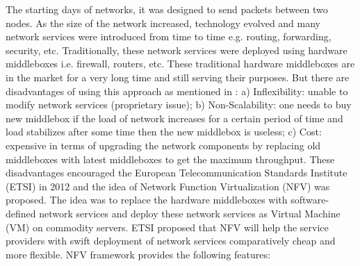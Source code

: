 \documentclass[10pt, a4paper, conference]{IEEEtran}
\begin{document}
The starting days of networks, it was designed to send packets between two nodes. As the size of the network increased, technology evolved and many network services were introduced from time to time e.g. routing, forwarding, security, etc. Traditionally, these network services were deployed using hardware middleboxes i.e. firewall, routers, etc. These traditional hardware middleboxes are in the market for a very long time and still serving their purposes. But there are disadvantages of using this approach as mentioned in \cite{Philippov2017}: 
a) Inflexibility: unable to modify network services (proprietary issue); b) Non-Scalability: one needs to buy new middlebox if the load of network increases for a certain period of time and load stabilizes after some time then the new middlebox is useless; c) Cost: expensive in terms of upgrading the network components by replacing old middleboxes with latest middleboxes to get the maximum throughput. These disadvantages encouraged the European Telecommunication Standards Institute (ETSI)\cite{ETSI2012} in 2012 and the idea of Network Function Virtualization (NFV) was proposed. The idea was to replace the hardware middleboxes with software-defined network services and deploy these network services as Virtual Machine (VM) on commodity servers. ETSI proposed that NFV will help the service providers with swift deployment of network services comparatively cheap and more flexible. %
NFV framework provides the following features\cite{Panda2017}:
\end{document}
